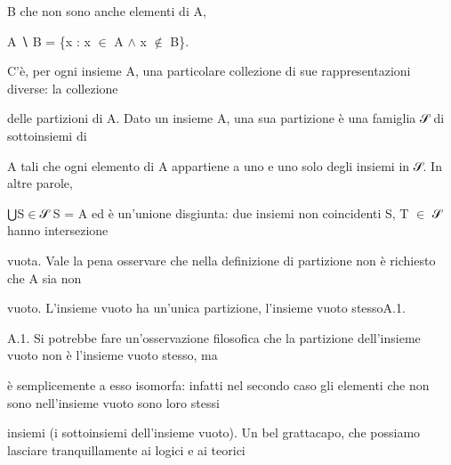 \documentclass[a4paper,portrait,12pt]{article}
\begin{document}
\begin{flushleft}
B che non sono anche elementi di A,
\end{flushleft}


\begin{flushleft}
A ∖ B = \{x : x $\in$ A $\land$ x $\notin$ B\}.
\end{flushleft}


\begin{flushleft}
C'\`{e}, per ogni insieme A, una particolare collezione di sue rappresentazioni diverse: la collezione
\end{flushleft}


\begin{flushleft}
delle partizioni di A. Dato un insieme A, una sua partizione \`{e} una famiglia 𝒮 di sottoinsiemi di
\end{flushleft}


\begin{flushleft}
A tali che ogni elemento di A appartiene a uno e uno solo degli insiemi in 𝒮. In altre parole,
\end{flushleft}


\begin{flushleft}
⋃S$\in$𝒮 S = A ed \`{e} un'unione disgiunta: due insiemi non coincidenti S, T $\in$ 𝒮 hanno intersezione
\end{flushleft}


\begin{flushleft}
vuota. Vale la pena osservare che nella definizione di partizione non \`{e} richiesto che A sia non
\end{flushleft}


\begin{flushleft}
vuoto. L'insieme vuoto ha un'unica partizione, l'insieme vuoto stessoA.1.
\end{flushleft}


\begin{flushleft}
A.1. Si potrebbe fare un'osservazione filosofica che la partizione dell'insieme vuoto non \`{e} l'insieme vuoto stesso, ma
\end{flushleft}


\begin{flushleft}
\`{e} semplicemente a esso isomorfa: infatti nel secondo caso gli elementi che non sono nell'insieme vuoto sono loro stessi
\end{flushleft}


\begin{flushleft}
insiemi (i sottoinsiemi dell'insieme vuoto). Un bel grattacapo, che possiamo lasciare tranquillamente ai logici e ai teorici
\end{flushleft}
\end{document}
